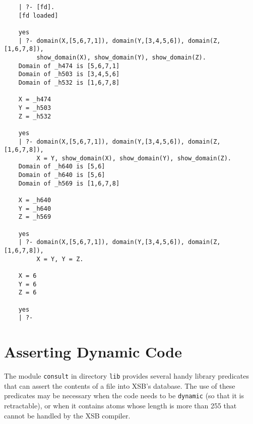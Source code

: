 \begin{small}
\begin{verbatim}
    | ?- [fd].
    [fd loaded]
    
    yes
    | ?- domain(X,[5,6,7,1]), domain(Y,[3,4,5,6]), domain(Z,[1,6,7,8]),
         show_domain(X), show_domain(Y), show_domain(Z).
    Domain of _h474 is [5,6,7,1]
    Domain of _h503 is [3,4,5,6]
    Domain of _h532 is [1,6,7,8]
    
    X = _h474
    Y = _h503
    Z = _h532
    
    yes
    | ?- domain(X,[5,6,7,1]), domain(Y,[3,4,5,6]), domain(Z,[1,6,7,8]),
         X = Y, show_domain(X), show_domain(Y), show_domain(Z).
    Domain of _h640 is [5,6]
    Domain of _h640 is [5,6]
    Domain of _h569 is [1,6,7,8]
    
    X = _h640
    Y = _h640
    Z = _h569
    
    yes
    | ?- domain(X,[5,6,7,1]), domain(Y,[3,4,5,6]), domain(Z,[1,6,7,8]),
         X = Y, Y = Z.
    
    X = 6
    Y = 6
    Z = 6
    
    yes
    | ?- 
\end{verbatim}
\end{small}


\section{Asserting Dynamic Code} \label{LoadDyn}

The module {\tt consult} in directory {\tt lib} provides several handy
library predicates that can assert the contents of a file into XSB's
database.  The use of these predicates may be necessary when the code
needs to be {\tt dynamic} (so that it is retractable), or when it
contains atoms whose length is more than 255 that cannot be handled by
the XSB compiler.


